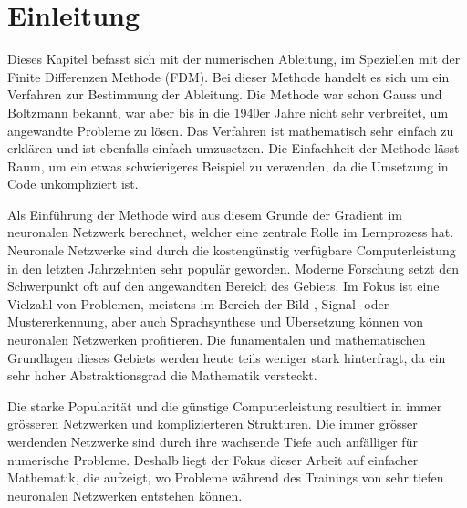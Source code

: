 %
%
%
\section{Einleitung\label{ableitung:section:einleitung}}
Dieses Kapitel befasst sich mit der numerischen Ableitung, im Speziellen mit der Finite Differenzen Methode (FDM).
Bei dieser Methode handelt es sich um ein Verfahren zur Bestimmung der Ableitung. Die Methode war schon Gauss und Boltzmann bekannt, war aber bis in die 1940er Jahre nicht sehr verbreitet, um angewandte Probleme zu lösen. Das Verfahren ist mathematisch sehr einfach zu erklären und ist ebenfalls einfach umzusetzen. Die Einfachheit der Methode lässt Raum, um ein etwas schwierigeres Beispiel zu verwenden, da die Umsetzung in Code unkompliziert ist.

Als Einführung der Methode wird aus diesem Grunde der Gradient im neuronalen Netzwerk berechnet, welcher eine zentrale Rolle im Lernprozess hat.
Neuronale Netzwerke sind durch die kostengünstig verfügbare Computerleistung in den letzten Jahrzehnten sehr populär geworden. Moderne Forschung setzt den Schwerpunkt oft auf den angewandten Bereich des Gebiets. Im Fokus ist eine Vielzahl von Problemen, meistens im Bereich der Bild-, Signal- oder Mustererkennung, aber auch Sprachsynthese und Übersetzung können von neuronalen Netzwerken profitieren. Die funamentalen und mathematischen Grundlagen dieses Gebiets werden heute teils weniger stark hinterfragt, da ein sehr hoher Abstraktionsgrad die Mathematik versteckt.

Die starke Popularität und die günstige Computerleistung resultiert in immer grösseren Netzwerken und komplizierteren Strukturen. Die immer grösser werdenden Netzwerke sind durch ihre wachsende Tiefe auch anfälliger für numerische Probleme. Deshalb liegt der Fokus dieser Arbeit auf einfacher Mathematik, die aufzeigt, wo Probleme während des Trainings von sehr tiefen neuronalen Netzwerken entstehen können.